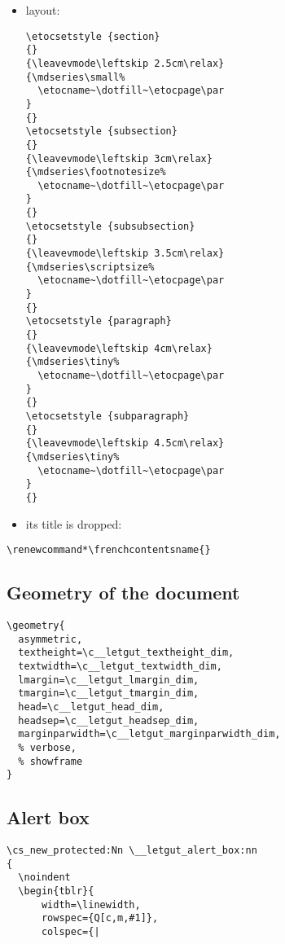 \documentclass{letgut}
\begin{document}
\begin{itemize}
\item layout:
\begin{lstlisting}
\etocsetstyle {section}
{}
{\leavevmode\leftskip 2.5cm\relax}
{\mdseries\small%
  \etocname~\dotfill~\etocpage\par
}
{}
\etocsetstyle {subsection}
{}
{\leavevmode\leftskip 3cm\relax}
{\mdseries\footnotesize%
  \etocname~\dotfill~\etocpage\par
}
{}
\etocsetstyle {subsubsection}
{}
{\leavevmode\leftskip 3.5cm\relax}
{\mdseries\scriptsize%
  \etocname~\dotfill~\etocpage\par
}
{}
\etocsetstyle {paragraph}
{}
{\leavevmode\leftskip 4cm\relax}
{\mdseries\tiny%
  \etocname~\dotfill~\etocpage\par
}
{}
\etocsetstyle {subparagraph}
{}
{\leavevmode\leftskip 4.5cm\relax}
{\mdseries\tiny%
  \etocname~\dotfill~\etocpage\par
}
{}
\end{lstlisting}
\item its title is dropped:
\end{itemize}
\begin{lstlisting}
\renewcommand*\frenchcontentsname{}
\end{lstlisting}

\subsection{Geometry of the document}
\label{ImplementationGeometryofthedocument-mqkg55h0jlj0}
\begin{lstlisting}
\geometry{
  asymmetric,
  textheight=\c__letgut_textheight_dim,
  textwidth=\c__letgut_textwidth_dim,
  lmargin=\c__letgut_lmargin_dim,
  tmargin=\c__letgut_tmargin_dim,
  head=\c__letgut_head_dim,
  headsep=\c__letgut_headsep_dim,
  marginparwidth=\c__letgut_marginparwidth_dim,
  % verbose,
  % showframe
}
\end{lstlisting}

\subsection{Alert box}
\label{ImplementationAlertbox-rblg55h0jlj0}
\begin{lstlisting}
\cs_new_protected:Nn \__letgut_alert_box:nn
{
  \noindent
  \begin{tblr}{
      width=\linewidth,
      rowspec={Q[c,m,#1]},
      colspec={|
\end{lstlisting}
\end{document}
